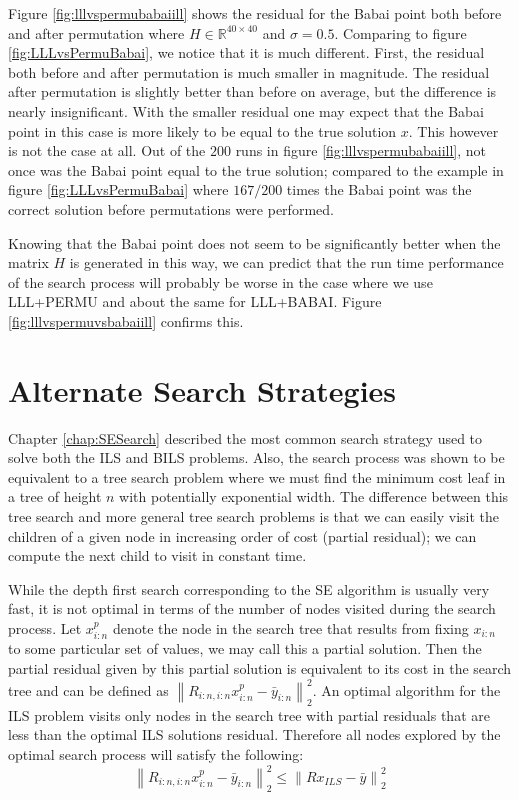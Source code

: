 \documentclass[12pt,Bold,letterpaper]{mcgilletdclass}
\begin{document}
Figure \ref{fig:lllvspermubabaiill} shows the residual for the Babai point both before and after permutation where $H \in \mathbb{R}^{40 \times 40}$ and $\sigma = 0.5$. Comparing to figure \ref{fig:LLLvsPermuBabai}, we notice that it is much different. First, the residual both before and after permutation is much smaller in magnitude. The residual after permutation is slightly better than before on average, but the difference is nearly insignificant. With the smaller residual one may expect that the Babai point in this case is more likely to be equal to the true solution $x$. This however is not the case at all. Out of the $200$ runs in figure \ref{fig:lllvspermubabaiill}, not once was the Babai point equal to the true solution; compared to the example in figure \ref{fig:LLLvsPermuBabai} where $167/200$ times the Babai point was the correct solution before permutations were performed.

Knowing that the Babai point does not seem to be significantly better when the matrix $H$ is generated in this way, we can predict that the run time performance of the search process will probably be worse in the case where we use LLL+PERMU and about the same for LLL+BABAI. Figure \ref{fig:lllvspermuvsbabaiill} confirms this.

\chapter{Alternate Search Strategies} \label{chap:Searches}

Chapter \ref{chap:SESearch} described the most common search strategy used to solve both the ILS and BILS problems. Also, the search process was shown to be equivalent to a tree search problem where we must find the minimum cost leaf in a tree of height $n$ with potentially exponential width. The difference between this tree search and more general tree search problems is that we can easily visit the children of a given node in increasing order of cost (partial residual); we can compute the next child to visit in constant time. 

While the depth first search corresponding to the SE algorithm is usually very fast, it is not optimal in terms of the number of nodes visited during the search process. Let $x_{i:n}^p$ denote the node in the search tree that results from fixing $x_{i:n}$ to some particular set of values, we may call this a partial solution. Then the partial residual given by this partial solution is equivalent to its cost in the search tree and can be defined as $\left \| R_{i:n,i:n}x_{i:n}^p - \bar{y}_{i:n}\right \|_2^2$. An optimal algorithm for the ILS problem visits only nodes in the search tree with partial residuals that are less than the optimal ILS solutions residual. Therefore all nodes explored by the optimal search process will satisfy the following:
\begin{equation}\label{eq:optimalSearchCond}
\left \| R_{i:n,i:n}x_{i:n}^p - \bar{y}_{i:n}\right \|_2^2 \le \left \| Rx_{ILS} - \bar{y} \right \|_2^2
\end{equation}
\end{document}
